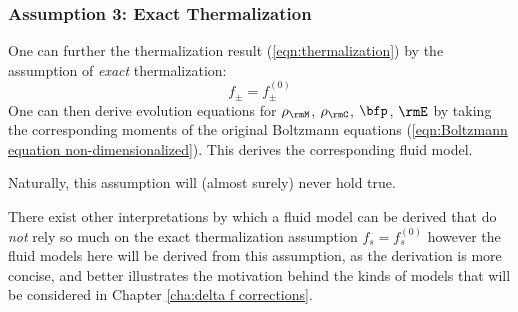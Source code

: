 \subsubsection*{Assumption 3: Exact Thermalization}
    One can further the thermalization result (\ref{eqn:thermalization}) by the assumption of \emph{exact} thermalization:
    \begin{equation}
      f_{\pm}  =  f_{\pm}^{(0)}
    \end{equation}
    One can then derive evolution equations for $\rho_{\rmM}$, $\rho_{\rmC}$, $\bfp$, $\rmE$ by taking the corresponding moments of the original Boltzmann equations (\ref{eqn:Boltzmann equation non-dimensionalized}). This derives the corresponding fluid model.

    \begin{remark}
        Naturally, this assumption will (almost surely) never hold true.
        
        There exist other interpretations by which a fluid model can be derived that do \emph{not} rely so much on the exact thermalization assumption $f_{s}  =  f_{s}^{(0)}$  however the fluid models here will be derived from this assumption, as the derivation is more concise, and better illustrates the motivation behind the kinds of models that will be considered in Chapter \ref{cha:delta f corrections}. 
    \end{remark}

